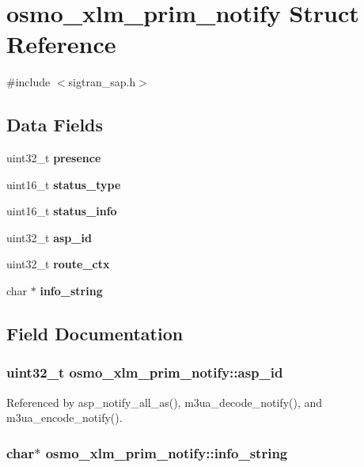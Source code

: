 \section{osmo\+\_\+xlm\+\_\+prim\+\_\+notify Struct Reference}
\label{structosmo__xlm__prim__notify}


{\ttfamily \#include $<$sigtran\+\_\+sap.\+h$>$}

\subsection*{Data Fields}
\begin{DoxyCompactItemize}
\item 
uint32\+\_\+t {\bf presence}
\item 
uint16\+\_\+t {\bf status\+\_\+type}
\item 
uint16\+\_\+t {\bf status\+\_\+info}
\item 
uint32\+\_\+t {\bf asp\+\_\+id}
\item 
uint32\+\_\+t {\bf route\+\_\+ctx}
\item 
char $\ast$ {\bf info\+\_\+string}
\end{DoxyCompactItemize}


\subsection{Field Documentation}
\subsubsection[{asp\+\_\+id}]{\setlength{\rightskip}{0pt plus 5cm}uint32\+\_\+t osmo\+\_\+xlm\+\_\+prim\+\_\+notify\+::asp\+\_\+id}\label{structosmo__xlm__prim__notify_a1a86536d0180788fedec86b70b3647d1}


Referenced by asp\+\_\+notify\+\_\+all\+\_\+as(), m3ua\+\_\+decode\+\_\+notify(), and m3ua\+\_\+encode\+\_\+notify().

\subsubsection[{info\+\_\+string}]{\setlength{\rightskip}{0pt plus 5cm}char$\ast$ osmo\+\_\+xlm\+\_\+prim\+\_\+notify\+::info\+\_\+string}\label{structosmo__xlm__prim__notify_a7a303e3d6d5fe06cabdbe3090f2ded60}


